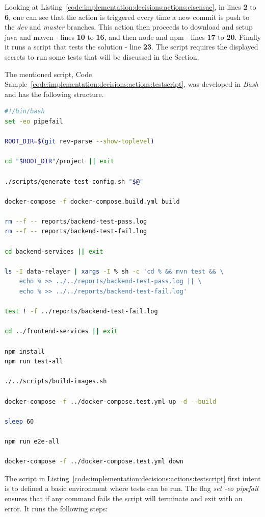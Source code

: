 Looking at Listing~\ref{code:implementation:decisions:actions:cisensae}, in lines \textbf{2} to \textbf{6}, one can see that the action is triggered every time a new commit is push to the \textit{dev} and \textit{master} branches.
This action then proceeds to download and setup java and maven - lines \textbf{10} to \textbf{16}, and then node and npm - lines \textbf{17} to \textbf{20}. Finally it runs a script that tests the solution - line \textbf{23}. The script requires the displayed secrets to run some tests that will be discussed in the  Section.

The mentioned script, Code Sample~\ref{code:implementation:decisions:actions:testscript}, was developed in \textit{Bash} and has the following structure.

\begin{lstlisting}[language=bash, style=bash, caption=Sensae Console Test Suite Script, label={code:implementation:decisions:actions:testscript}]
#!/bin/bash
set -eo pipefail

ROOT_DIR=$(git rev-parse --show-toplevel)

cd "$ROOT_DIR"/project || exit

./scripts/generate-test-config.sh "$@"

docker-compose -f docker-compose.build.yml build

rm --f -- reports/backend-test-pass.log
rm --f -- reports/backend-test-fail.log

cd backend-services || exit

ls -I data-relayer | xargs -I % sh -c 'cd % && mvn test && \
    echo % >> ../../reports/backend-test-pass.log || \
    echo % >> ../../reports/backend-test-fail.log'

test ! -f ../reports/backend-test-fail.log

cd ../frontend-services || exit

npm install
npm run test-all

./../scripts/build-images.sh

docker-compose -f ../docker-compose.test.yml up -d --build

sleep 60

npm run e2e-all

docker-compose -f ../docker-compose.test.yml down
\end{lstlisting}

The script in Listing~\ref{code:implementation:decisions:actions:testscript} first intent is to defined a basic environment where tests can be run.
The flag \textit{set -eo pipefail} ensures that if any command fails the script will terminate and exit with an error.
It runs the following steps:

